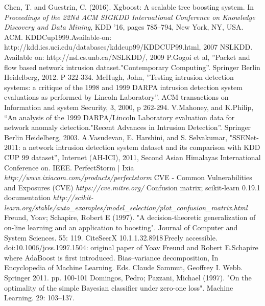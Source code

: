 \begin{thebibliography}{99}
 Chen, T. and Guestrin, C. (2016). Xgboost: A scalable tree boosting system. In \textit{Proceedings of the 22Nd ACM SIGKDD International Conference on Knowledge Discovery and Data Mining}, KDD ’16, pages 785–794, New York, NY, USA. ACM.
 KDDCup1999.Available-on: http://kdd.ics.uci.edu/databases/kddcup99/KDDCUP99.html, 2007
 NSLKDD. Available on: http://nsl.cs.unb.ca/NSLKDD/, 2009
 P.Gogoi et al, ”Packet and flow based network intrusion dataset."Contemporary Computing”. Springer Berlin Heidelberg, 2012. P 322-334.
 McHugh, John, ”Testing intrusion detection systems: a critique of the 1998 and 1999 DARPA intrusion detection system evaluations as performed by Lincoln Laboratory”. ACM transactions on Information and system Security, 3, 2000, p 262-294.
 V.Mahoney, and K.Philip, “An analysis of the 1999 DARPA/Lincoln Laboratory evaluation data for network anomaly detection."Recent Advances in Intrusion Detection”. Springer Berlin Heidelberg, 2003.
 A.Vasudevan, E. Harshini, and S. Selvakumar, "SSENet-2011: a network intrusion detection system dataset and its comparison with KDD CUP 99 dataset”, Internet (AH-ICI), 2011, Second Asian Himalayas International Conference on. IEEE.
 PerfectStorm | Ixia \textit{http://www.ixiacom.com/products/perfectstorm}
CVE - Common Vulnerabilities and Exposures (CVE) \textit{ https://cve.mitre.org/}
 Confusion matrix; scikit-learn 0.19.1 documentation \textit{http://scikit-learn.org/stable/auto\_examples/model\_selection/plot\_confusion\_matrix.html}
 Freund, Yoav; Schapire, Robert E (1997). "A decision-theoretic generalization of on-line learning and an application to boosting". Journal of Computer and System Sciences. 55: 119. CiteSeerX 10.1.1.32.8918 Freely accessible. doi:10.1006/jcss.1997.1504: original paper of Yoav Freund and Robert E.Schapire where AdaBoost is first introduced.
  Bias–variance decomposition, In Encyclopedia of Machine Learning. Eds. Claude Sammut, Geoffrey I. Webb. Springer 2011. pp. 100-101
 Domingos, Pedro; Pazzani, Michael (1997). "On the optimality of the simple Bayesian classifier under zero-one loss". Machine Learning. 29: 103–137.
\end{thebibliography}